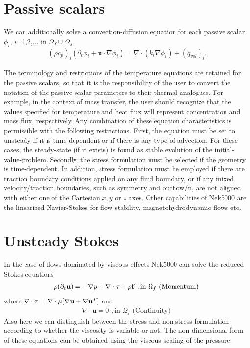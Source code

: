 {\section{Passive scalars}\label{sec:passive_scal}

We can additionally solve a convection-diffusion equation for each passive scalar \(\phi_i\),
\(i\)=1,2,\(\ldots\) in \(\Omega_f \cup \Omega_s\)
\begin{eqnarray}\label{eq:pass_scal}
   (\rho c_{p})_i ( \partial_{t} \phi_{i} + \mathbf u \cdot \nabla \phi_{i} ) =
   \nabla \cdot (k_i \nabla \phi_{i}) + (q_{vol})_i.
\end{eqnarray}

The terminology and
restrictions of the temperature equations are retained for
the passive scalars, so that it is the responsibility of the
user to convert the notation of the passive scalar
parameters to their thermal analogues.
For example, in the context of mass transfer,
the user should recognize that the values specified
for temperature and heat flux
will represent concentration and mass flux, respectively.
Any combination of these equation characteristics is permissible with the
following restrictions. First, the equation must be set to unsteady if it is
time-dependent or if there is any type of advection. For these cases, the
steady-state (if it exists) is found as stable evolution of the
initial-value-problem. Secondly, the stress formulation must be selected if
the geometry is time-dependent. In addition, stress formulation must be
employed if there are traction boundary conditions applied on any fluid
boundary, or if any mixed velocity/traction boundaries, such as symmetry and
outflow/n, are not aligned with either one of the Cartesian \(x,y\) or \(z\) axes.
Other capabilities of Nek5000 are the linearized Navier-Stokes for flow stability, magnetohydrodynamic flows etc.



\section{Unsteady Stokes }
In the case of flows dominated by viscous effects Nek5000 can solve the reduced Stokes equations
\begin{eqnarray}\label{eq:ns_momentum_stokes}
 \rho(\partial_{t} \mathbf u ) = - \nabla p + \nabla \cdot \tau + \rho {\bf f} \,\, , \text{in } \Omega_f \text{  (Momentum)  }
\end{eqnarray}
where \(\nabla \cdot\tau=\nabla\cdot\mu[\nabla \mathbf{u}+\nabla \mathbf{u}^{T}]\) and
\begin{eqnarray}\label{eq:ns_cont_stokes}
 \nabla \cdot \mathbf u =0 \,\, , \text{in } \Omega_f  \text{  (Continuity)  } 
\end{eqnarray}
Also here we can distinguish between the stress and non-stress formulation according to whether the viscosity is variable or not. The non-dimensional form of these equations can be obtained using the viscous scaling of the pressure.


}
